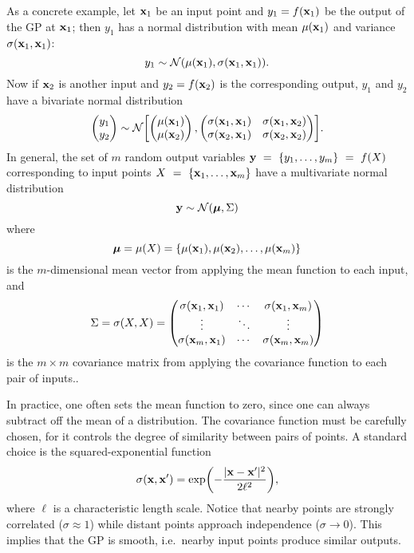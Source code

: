 \documentclass[aps,prc,reprint,amsmath]{revtex4-1}
\begin{document}
As a concrete example, let $\mathbf x_1$ be an input point and $y_1 = f(\mathbf x_1)$ be the output of the GP at $\mathbf x_1$; then $y_1$ has a normal distribution with mean $\mu(\mathbf x_1)$ and variance $\sigma(\mathbf x_1, \mathbf x_1)$:
\begin{equation}
  y_1 \sim \mathcal N(\mu(\mathbf x_1), \sigma(\mathbf x_1, \mathbf x_1)).
\end{equation}
Now if $\mathbf x_2$ is another input and $y_2 = f(\mathbf x_2)$ is the corresponding output, $y_1$ and $y_2$ have a bivariate normal distribution
\begin{equation}
  \begin{pmatrix}
    y_1 \\ y_2
  \end{pmatrix}
  \sim \mathcal N\biggl[
    \begin{pmatrix}
      \mu(\mathbf x_1) \\ \mu(\mathbf x_2)
    \end{pmatrix},
    \begin{pmatrix}
      \sigma(\mathbf x_1, \mathbf x_1) & \sigma(\mathbf x_1, \mathbf x_2) \\
      \sigma(\mathbf x_2, \mathbf x_1) & \sigma(\mathbf x_2, \mathbf x_2) \\
    \end{pmatrix}
  \biggr].
\end{equation}
In general, the set of $m$ random output variables $\mathbf y~=~\{y_1, \ldots, y_m\}~=~f(X)$ corresponding to input points $X~=~\{\mathbf x_1, \ldots, \mathbf x_m\}$ have a multivariate normal distribution
\begin{equation}
  \mathbf y \sim \mathcal N(\boldsymbol\mu, \Sigma)
\end{equation}
where
\begin{equation}
  \boldsymbol\mu = \mu(X) = \{\mu(\mathbf x_1), \mu(\mathbf x_2), \ldots, \mu(\mathbf x_m)\} \\
\end{equation}
is the $m$-dimensional mean vector from applying the mean function to each input, and
\begin{equation}
  \Sigma = \sigma(X, X) =
  \begin{pmatrix}
    \sigma(\mathbf x_1, \mathbf x_1) & \cdots & \sigma(\mathbf x_1, \mathbf x_m) \\
    \vdots & \ddots & \vdots \\
    \sigma(\mathbf x_m, \mathbf x_1) & \cdots & \sigma(\mathbf x_m, \mathbf x_m) \\
  \end{pmatrix}
\end{equation}
is the $m \times m$ covariance matrix from applying the covariance function to each pair of inputs..

In practice, one often sets the mean function to zero, since one can always subtract off the mean of a distribution.
The covariance function must be carefully chosen, for it controls the degree of similarity between pairs of points.
A standard choice is the squared-exponential function
\begin{equation}
  \sigma(\mathbf x, \mathbf x') = \exp\biggl( -\frac{|\mathbf x - \mathbf x'|^2}{2\ell^2} \biggr),
\end{equation}
where $\ell$ is a characteristic length scale.
Notice that nearby points are strongly correlated ($\sigma \approx 1$) while distant points approach independence ($\sigma \rightarrow 0$).
This implies that the GP is smooth, i.e.\ nearby input points produce similar outputs.
\end{document}
